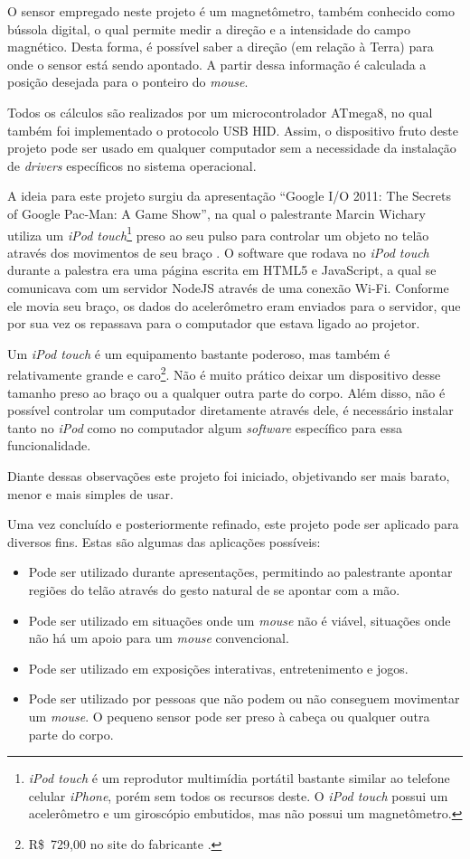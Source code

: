 \documentclass[brazil,pagestart=firstchapter]{abnt}
\begin{document}
O sensor empregado neste projeto é um magnetômetro, também conhecido como
bússola digital, o qual permite medir a direção e a intensidade do campo
magnético. Desta forma, é possível saber a direção (em relação à Terra) para
onde o sensor está sendo apontado. A partir dessa informação é calculada
a posição desejada para o ponteiro do \textit{mouse}.

Todos os cálculos são realizados por um microcontrolador ATmega8, no qual
também foi implementado o protocolo \acs{USB} \acs{HID}. Assim, o
dispositivo fruto deste projeto pode ser usado em qualquer computador sem a
necessidade da instalação de \textit{drivers} específicos no sistema
operacional.

A ideia para este projeto surgiu da apresentação ``Google I/O 2011: The
Secrets of Google Pac-Man: A Game Show'', na qual o palestrante Marcin
Wichary utiliza um \textit{iPod touch}\footnote{
	\textit{iPod touch} é um reprodutor multimídia portátil bastante similar
	ao telefone celular \textit{iPhone}, porém sem todos os recursos deste.
	O \textit{iPod touch} possui um acelerômetro e um giroscópio embutidos,
	mas não possui um magnetômetro.
} preso ao seu pulso para controlar um objeto no telão através dos
movimentos de seu braço \cite{GoogleIO2011}. O software
que rodava no \textit{iPod touch} durante a palestra era uma página escrita
em HTML5 e JavaScript, a qual se comunicava com um servidor NodeJS através
de uma conexão Wi-Fi. Conforme ele movia seu braço, os dados do acelerômetro
eram enviados para o servidor, que por sua vez os repassava para o
computador que estava ligado ao projetor.

Um \textit{iPod touch} é um equipamento bastante poderoso, mas também é
relativamente grande e caro\footnote{
	R\$~729,00 no site do fabricante \cite{AppleStoreiPodTouch}.
}. Não é muito prático deixar um dispositivo desse tamanho preso ao braço ou
a qualquer outra parte do corpo. Além disso, não é possível controlar um
computador diretamente através dele, é necessário instalar tanto no
\textit{iPod} como no computador algum \textit{software} específico para
essa funcionalidade.

Diante dessas observações este projeto foi iniciado, objetivando ser mais
barato, menor e mais simples de usar.

Uma vez concluído e posteriormente refinado, este projeto pode ser aplicado
para diversos fins. Estas são algumas das aplicações possíveis:

\begin{itemize}
\item Pode ser utilizado durante apresentações, permitindo ao palestrante
apontar regiões do telão através do gesto natural de se apontar com a mão.
\item Pode ser utilizado em situações onde um \textit{mouse} não é viável,
situações onde não há um apoio para um \textit{mouse} convencional.
\item Pode ser utilizado em exposições interativas, entretenimento e jogos.
\item Pode ser utilizado por pessoas que não podem ou não conseguem
movimentar um \textit{mouse}. O pequeno sensor pode ser preso à cabeça ou
qualquer outra parte do corpo.
\end{itemize}
\end{document}
